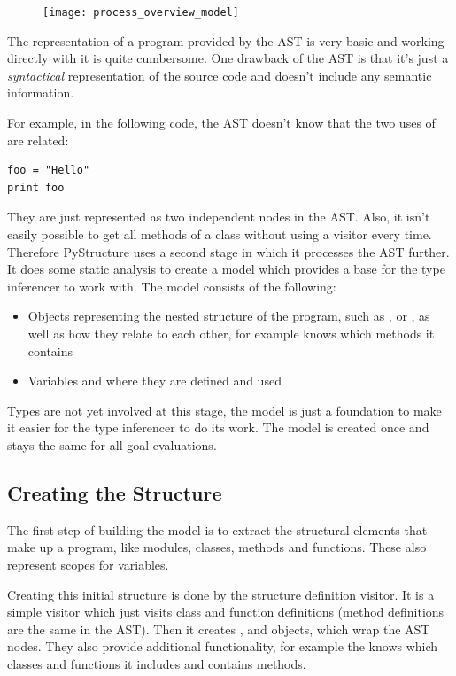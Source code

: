 \documentclass[12pt,halfparskip,DIV11,BCOR10mm]{scrreprt}
\begin{document}
\begin{figure}
	\vspace{-0.7cm}
	\texttt{[image: process\_overview\_model]}
	\vspace{-1cm}
\end{figure}

The representation of a program provided by the AST is very basic and working directly with it is quite cumbersome. 
One drawback of the AST is that it's just a \emph{syntactical} representation of the source code and doesn't include any semantic information.

For example, in the following code, the AST doesn't know that the two uses of  are related:

\begin{lstlisting}
foo = "Hello"
print foo
\end{lstlisting}

They are just represented as two independent  nodes in the AST. Also, it isn't easily possible to get all methods of a class without using a visitor every time. Therefore PyStructure uses a second stage in which it processes the AST further. It does some static analysis to create a model which provides a base for the type inferencer to work with. The model consists of the following:

\begin{itemize}
	\item Objects representing the nested structure of the program, such as ,  or , as well as how they relate to each other, for example  knows which methods it contains
	\item Variables and where they are defined and used
\end{itemize}

Types are not yet involved at this stage, the model is just a foundation to make it easier for the type inferencer to do its work. The model is created once and stays the same for all goal evaluations.

\subsection{Creating the Structure}

The first step of building the model is to extract the structural elements that make up a program, like modules, classes, methods and functions. These also represent scopes for variables.

Creating this initial structure is done by the structure definition visitor. It is a simple visitor which just visits class and function definitions (method definitions are the same in the AST). Then it creates ,  and  objects, which wrap the AST nodes. They also provide additional functionality, for example the  knows which classes and functions it includes and  contains methods.
\end{document}
